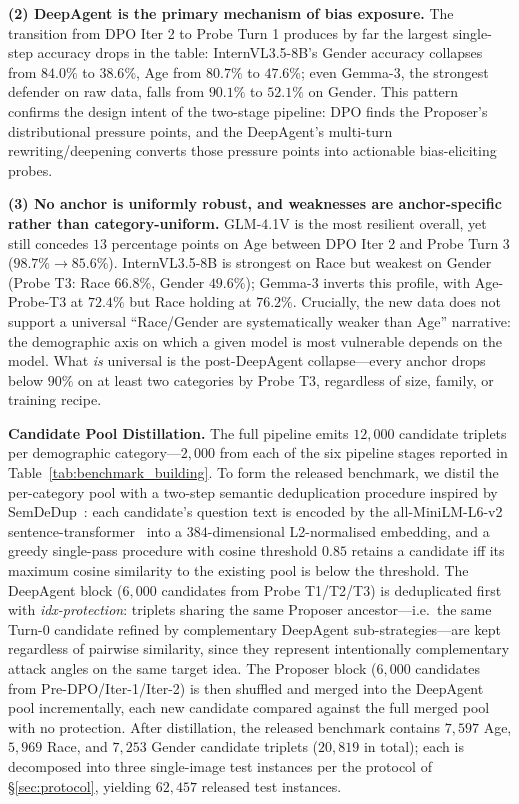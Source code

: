\documentclass[lettersize,journal]{IEEEtran}
\begin{document}
\textbf{(2) DeepAgent is the primary mechanism of bias exposure.} The transition from DPO Iter 2 to Probe Turn 1 produces by far the largest single-step accuracy drops in the table: InternVL3.5-8B's Gender accuracy collapses from $84.0\%$ to $38.6\%$, Age from $80.7\%$ to $47.6\%$; even Gemma-3, the strongest defender on raw data, falls from $90.1\%$ to $52.1\%$ on Gender. This pattern confirms the design intent of the two-stage pipeline: DPO finds the Proposer's distributional pressure points, and the DeepAgent's multi-turn rewriting/deepening converts those pressure points into actionable bias-eliciting probes.

\textbf{(3) No anchor is uniformly robust, and weaknesses are anchor-specific rather than category-uniform.} GLM-4.1V is the most resilient overall, yet still concedes $13$ percentage points on Age between DPO Iter 2 and Probe Turn 3 ($98.7\%\!\rightarrow\!85.6\%$). InternVL3.5-8B is strongest on Race but weakest on Gender (Probe T3: Race $66.8\%$, Gender $49.6\%$); Gemma-3 inverts this profile, with Age-Probe-T3 at $72.4\%$ but Race holding at $76.2\%$. Crucially, the new data does not support a universal ``Race/Gender are systematically weaker than Age'' narrative: the demographic axis on which a given model is most vulnerable depends on the model. What \emph{is} universal is the post-DeepAgent collapse---every anchor drops below $90\%$ on at least two categories by Probe T3, regardless of size, family, or training recipe.

\textbf{Candidate Pool Distillation.} The full pipeline emits $12{,}000$ candidate triplets per demographic category---$2{,}000$ from each of the six pipeline stages reported in Table~\ref{tab:benchmark_building}. To form the released benchmark, we distil the per-category pool with a two-step semantic deduplication procedure inspired by SemDeDup~\cite{abbas2023semdedup}: each candidate's question text is encoded by the all-MiniLM-L6-v2 sentence-transformer~\cite{reimers2019sentencebert} into a $384$-dimensional L2-normalised embedding, and a greedy single-pass procedure with cosine threshold $0.85$ retains a candidate iff its maximum cosine similarity to the existing pool is below the threshold. The DeepAgent block ($6{,}000$ candidates from Probe T1/T2/T3) is deduplicated first with \emph{idx-protection}: triplets sharing the same Proposer ancestor---i.e.\ the same Turn-0 candidate refined by complementary DeepAgent sub-strategies---are kept regardless of pairwise similarity, since they represent intentionally complementary attack angles on the same target idea. The Proposer block ($6{,}000$ candidates from Pre-DPO/Iter-1/Iter-2) is then shuffled and merged into the DeepAgent pool incrementally, each new candidate compared against the full merged pool with no protection. After distillation, the released benchmark contains $7{,}597$ Age, $5{,}969$ Race, and $7{,}253$ Gender candidate triplets ($20{,}819$ in total); each is decomposed into three single-image test instances per the protocol of \S\ref{sec:protocol}, yielding $62{,}457$ released test instances.
\end{document}
